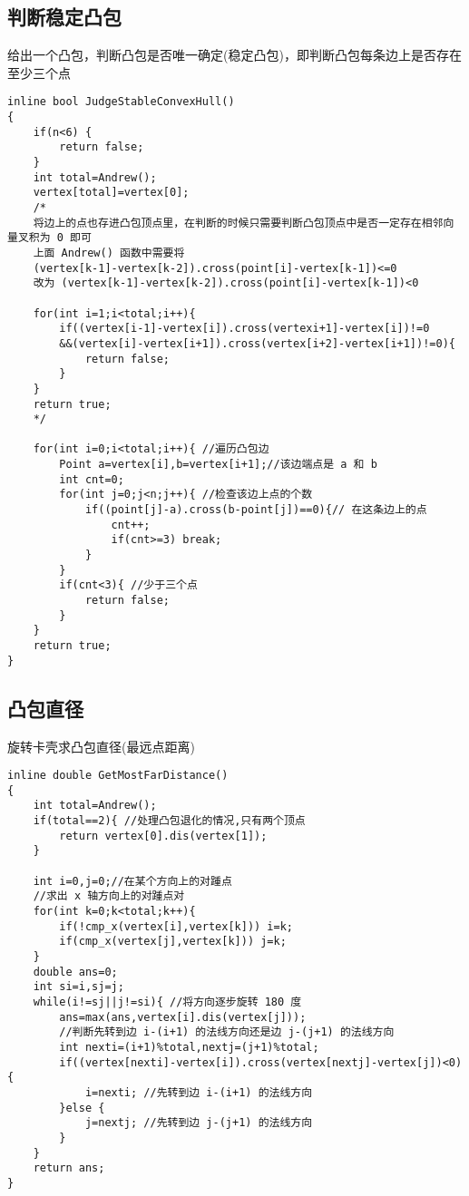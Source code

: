 \subsection{判断稳定凸包}
给出一个凸包，判断凸包是否唯一确定(稳定凸包)，即判断凸包每条边上是否存在至少三个点
\begin{lstlisting}
inline bool JudgeStableConvexHull()
{
    if(n<6) {
        return false;
    }
    int total=Andrew();
    vertex[total]=vertex[0];
    /*
    将边上的点也存进凸包顶点里，在判断的时候只需要判断凸包顶点中是否一定存在相邻向量叉积为 0 即可
    上面 Andrew() 函数中需要将
    (vertex[k-1]-vertex[k-2]).cross(point[i]-vertex[k-1])<=0
    改为 (vertex[k-1]-vertex[k-2]).cross(point[i]-vertex[k-1])<0

    for(int i=1;i<total;i++){
        if((vertex[i-1]-vertex[i]).cross(vertexi+1]-vertex[i])!=0
        &&(vertex[i]-vertex[i+1]).cross(vertex[i+2]-vertex[i+1])!=0){
            return false;
        }
    }
    return true;
    */

    for(int i=0;i<total;i++){ //遍历凸包边
        Point a=vertex[i],b=vertex[i+1];//该边端点是 a 和 b
        int cnt=0;
        for(int j=0;j<n;j++){ //检查该边上点的个数
            if((point[j]-a).cross(b-point[j])==0){// 在这条边上的点
                cnt++;
                if(cnt>=3) break;
            }
        }
        if(cnt<3){ //少于三个点
            return false;
        }
    }
    return true;
}
\end{lstlisting}

\subsection{凸包直径}
旋转卡壳求凸包直径(最远点距离)
\begin{lstlisting}
inline double GetMostFarDistance()
{
    int total=Andrew();
    if(total==2){ //处理凸包退化的情况,只有两个顶点
        return vertex[0].dis(vertex[1]);
    }

    int i=0,j=0;//在某个方向上的对踵点
    //求出 x 轴方向上的对踵点对
    for(int k=0;k<total;k++){
        if(!cmp_x(vertex[i],vertex[k])) i=k;
        if(cmp_x(vertex[j],vertex[k])) j=k;
    }
    double ans=0;
    int si=i,sj=j;
    while(i!=sj||j!=si){ //将方向逐步旋转 180 度
        ans=max(ans,vertex[i].dis(vertex[j]));
        //判断先转到边 i-(i+1) 的法线方向还是边 j-(j+1) 的法线方向
        int nexti=(i+1)%total,nextj=(j+1)%total;
        if((vertex[nexti]-vertex[i]).cross(vertex[nextj]-vertex[j])<0){
            i=nexti; //先转到边 i-(i+1) 的法线方向
        }else {
            j=nextj; //先转到边 j-(j+1) 的法线方向
        }
    }
    return ans;
}
\end{lstlisting}

